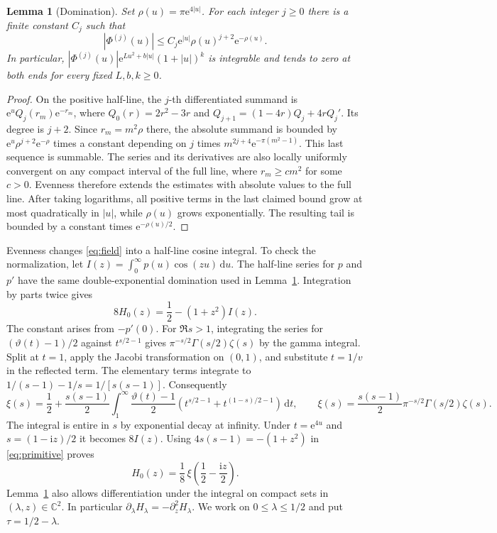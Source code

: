 \documentclass[11pt]{article}
\numberwithin{equation}{section}
\newtheorem{lemma}[theorem]{Lemma}
\newcommand{\C}{\mathbb C}
\newcommand{\ee}{\mathrm e}
\newcommand{\ii}{\mathrm i}
\newcommand{\dd}{\,\mathrm d}
\begin{document}
\begin{lemma}[Domination]\label{lem:domination}
Set \(\rho(u)=\pi\ee^{4|u|}\). For each integer \(j\ge0\) there is a
finite constant \(C_j\) such that
\[
 |\Phi^{(j)}(u)|\le C_j \ee^{|u|}\rho(u)^{j+2}\ee^{-\rho(u)} .
\]
In particular, \(|\Phi^{(j)}(u)|\ee^{L u^2+b|u|}(1+|u|)^k\)
is integrable and tends to zero at both ends for every fixed
\(L,b,k\ge0\).
\end{lemma}
\begin{proof}
On the positive half-line, the \(j\)-th differentiated summand is
\(\ee^u Q_j(r_m)\ee^{-r_m}\), where \(Q_0(r)=2r^2-3r\) and
\(Q_{j+1}=(1-4r)Q_j+4rQ_j'\). Its degree is \(j+2\).
Since \(r_m=m^2\rho\) there, the absolute summand is bounded by
\(\ee^u\rho^{j+2}\ee^{-\rho}\) times a constant depending on \(j\)
times \(m^{2j+4}\ee^{-\pi(m^2-1)}\). This last sequence is summable.
The series and its derivatives are also locally uniformly convergent
on any compact interval of the full line, where \(r_m\ge c m^2\)
for some \(c>0\). Evenness therefore extends the estimates with
absolute values to the full line. After taking logarithms, all
positive terms in the last claimed bound grow at most quadratically
in \(|u|\), while \(\rho(u)\) grows exponentially. The resulting
tail is bounded by a constant times \(\ee^{-\rho(u)/2}\).
\end{proof}

Evenness changes \eqref{eq:field} into a half-line cosine integral.
To check the normalization, let
\(I(z)=\int_0^\infty p(u)\cos(zu)\dd u\).
The half-line series for \(p\) and \(p'\) have the same
double-exponential domination used in Lemma~\ref{lem:domination}.
Integration by parts twice gives
\begin{equation}\label{eq:primitive}
 8H_0(z)=\frac12-(1+z^2)I(z).
\end{equation}
The constant arises from \(-p'(0)\). For \(\Re s>1\), integrating
the series for \((\vartheta(t)-1)/2\) against \(t^{s/2-1}\) gives
\(\pi^{-s/2}\Gamma(s/2)\zeta(s)\) by the gamma integral.
Split at \(t=1\), apply the Jacobi transformation on \((0,1)\), and
substitute \(t=1/v\) in the reflected term. The elementary terms
integrate to \(1/(s-1)-1/s=1/[s(s-1)]\). Consequently
\[
 \xi(s)=\frac12+\frac{s(s-1)}2
   \int_1^\infty\frac{\vartheta(t)-1}{2}
     \left(t^{s/2-1}+t^{(1-s)/2-1}\right)\dd t,\qquad
 \xi(s)=\frac{s(s-1)}2\pi^{-s/2}\Gamma(s/2)\zeta(s).
\]
The integral is entire in \(s\) by exponential decay at infinity.
Under \(t=\ee^{4u}\) and \(s=(1-\ii z)/2\) it becomes \(8I(z)\).
Using \(4s(s-1)=-(1+z^2)\) in \eqref{eq:primitive} proves
\begin{equation}\label{eq:xi}
 H_0(z)=\frac18\,\xi\!\left(\frac12-\frac{\ii z}{2}\right).
\end{equation}
Lemma~\ref{lem:domination} also allows differentiation under the
integral on compact sets in \((\lambda,z)\in\C^2\).
In particular \(\partial_\lambda H_\lambda=-\partial_z^2H_\lambda\).
We work on \(0\le\lambda\le1/2\) and put \(\tau=1/2-\lambda\).
\end{document}
